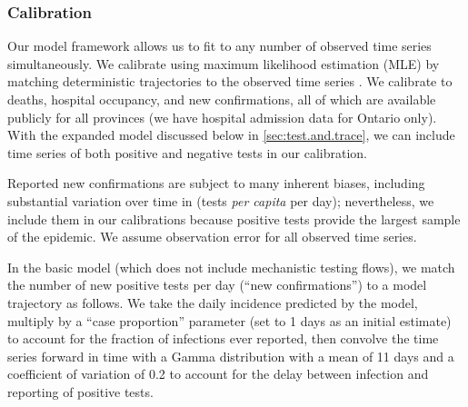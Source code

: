 \documentclass[12pt]{article}\usepackage[]{graphicx}\usepackage[]{color}
\begin{document}
\subsubsection*{Calibration}

Our model framework allows us to fit to any number of observed time
series simultaneously.  We calibrate using
maximum likelihood estimation (MLE) by matching deterministic
trajectories to the observed time series \cite{Bolk08}.  We calibrate
to deaths, hospital occupancy, and new confirmations, all of which are
available publicly for all provinces (we have hospital admission data
for Ontario only).  With the expanded model discussed below in
\cref{sec:test.and.trace}, we can include time series of both positive
and negative tests in our calibration.

Reported new confirmations are subject to many inherent biases,
including substantial variation over time in 
(\ie tests \emph{per capita} per day); nevertheless, we include them
in our calibrations because positive tests provide the largest sample
of the epidemic.  We assume
 observation error for all observed time series.

In the basic model (which does not include mechanistic testing flows),
we match the number of new positive tests per day (``new
confirmations'') to a model trajectory as follows.  We take the daily
incidence predicted by the model, multiply by a ``case proportion''
parameter  (set to 1 days as an
initial estimate) to account for the fraction of infections ever
reported, then convolve the time series forward in time with a Gamma
distribution with a mean of 11 days and a coefficient of
variation of 0.2 to account for the delay between infection
and reporting of positive tests.  
\end{document}
